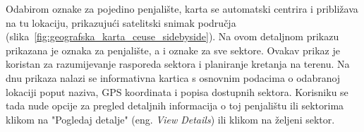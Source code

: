 Odabirom oznake za pojedino penjalište, karta se automatski centrira i približava na tu lokaciju, prikazujući satelitski snimak područja (slika~\ref{fig:geografska_karta_ceuse_sidebyside}). Na ovom detaljnom prikazu prikazana je oznaka za penjalište, a i oznake za sve sektore. Ovakav prikaz je koristan za razumijevanje rasporeda sektora i planiranje kretanja na terenu. Na dnu prikaza nalazi se informativna kartica s osnovnim podacima o odabranoj lokaciji poput naziva, GPS koordinata i popisa dostupnih sektora. Korisniku se tada nude opcije za pregled detaljnih informacija o toj penjalištu ili sektorima klikom na "Pogledaj detalje" (eng. \textit{View Details}) ili klikom na željeni sektor.
